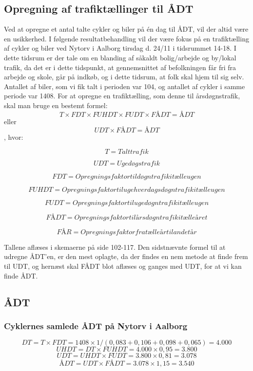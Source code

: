 \subsection{Opregning af trafiktællinger til ÅDT}
\label{sub:opregning}
Ved at opregne et antal talte cykler og biler på én dag til ÅDT, vil der altid være en usikkerhed. 
I følgende resultatbehandling vil der være fokus på en trafiktælling af cykler og biler ved Nytorv i Aalborg tirsdag d. 24/11 i tidsrummet 14-18. I dette tidsrum er der tale om en blanding af såkaldt bolig/arbejde og by/lokal trafik, da det er i dette tidspunkt, at gennemsnittet af befolkningen får fri fra arbejde og skole, går på indkøb, og i dette tidsrum, at folk skal hjem til sig selv.
Antallet af biler, som vi fik talt i perioden var 104, og antallet af cykler i samme periode var 1408.
For at opregne en trafiktælling, som denne til årsdøgnstrafik, skal man bruge en bestemt formel:
$$ T \times FDT \times FUHDT \times FUDT \times FÅDT = ÅDT $$ eller $$ UDT \times FÅDT = ÅDT$$ , hvor:

$$T = Talt trafik$$

$$UDT = Ugedøgstrafik$$

$$FDT = Opregningsfaktor til døgntrafik i tælleugen$$

$$FUHDT = Opregningsfaktor til ugehverdagsdøgntrafik i tælleugen$$

$$FUDT = Opregningsfaktor til ugedøgntrafik i tælleugen$$

$$FÅDT = Opregningsfaktor til årsdøgntrafik i tælleåret$$ 

$$FÅR = Opregningsfaktor fra tælleår til andet år$$

Tallene aflæses i skemaerne på side 102-117. Den sidstnævnte formel til at udregne ÅDT’en, er den mest oplagte, da der findes en nem metode at finde frem til UDT, og hernæst skal FÅDT blot aflæses og ganges med UDT, for at vi kan finde ÅDT.

\subsection{ÅDT}
\label{AEDT}
\subsubsection{Cyklernes samlede ÅDT på Nytorv i Aalborg}
$$DT = T \times FDT = 1408 \times 1/(0,083+0,106+0,098+0,065) = 4.000$$
$$UHDT = DT \times FUHDT = 4.000 \times 0,95 = 3.800$$
$$UDT = UHDT \times FUDT = 3.800 \times 0,81 = 3.078$$
$$ÅDT = UDT \times FÅDT = 3.078 \times 1,15 = 3.540$$
